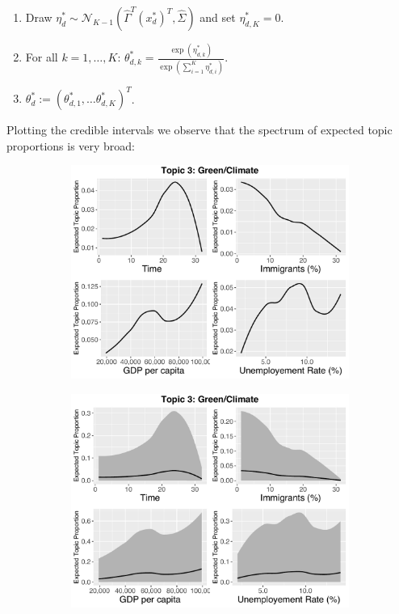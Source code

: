 \begin{enumerate}
\item Draw $\eta_d^* \sim \mathcal{N}_{K-1}(\hat{\Gamma}^T(x_d^*)^T, \hat{\Sigma})$ and set $\eta^*_{d,K} = 0$.
\item For all $k = 1,\dots,K$: $\theta_{d,k}^* = \frac{\exp(\eta^*_{d,k})}{\exp(\sum_{i=1}^{K} \eta^*_{d,i})}$.
\item $\theta_d^* := (\theta_{d,1}^*, \dots \theta_{d,K}^*)^T$.
\end{enumerate}

Plotting the credible intervals we observe that the spectrum of expected topic proportions is very broad:

\begin{figure}[h!]
    \centering
     \captionsetup{justification=centering,margin=2cm}
  \begin{subfigure}[b]{0.3\linewidth}
    \includegraphics[width=\linewidth]{../plots/4_4/direct_t3_without_credible.pdf}
  \end{subfigure}
  \begin{subfigure}[b]{0.3\linewidth}
    \includegraphics[width=\linewidth]{../plots/4_4/direct_t3_with_credible.pdf}

\end{subfigure}
\end{figure}
